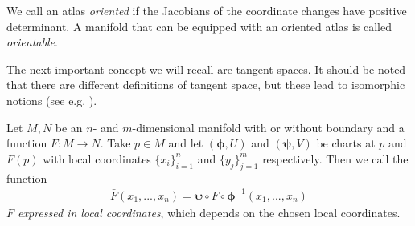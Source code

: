 \documentclass[../master_thesis.tex]{subfiles}
\begin{document}
\begin{definition}
    We call an atlas \textit{oriented} if the Jacobians of the coordinate
    changes have positive determinant. A manifold that can be equipped with 
    an oriented atlas is called \textit{orientable}.
\end{definition}


The next important concept we will recall are tangent spaces. 
It should be noted that there are different definitions of tangent space, but
these lead to isomorphic notions 
(see e.g. \cite[Sec.\,1.B]{gallot_hulin_lafontaine}).

\begin{definition}
    Let $M, N$ be an $n$- and $m$-dimensional manifold with or without boundary 
    and a function $F: M \rightarrow N$. Take $p \in M$ and let $(\boldsymbol{\phi}, U)$ 
    and $(\boldsymbol{\psi},V)$ be charts at $p$ and $F(p)$ with local 
    coordinates $\{x_i\}_{i=1}^n$ and $\{y_j\}_{j=1}^m$ respectively. 
    Then we call the function 
    \begin{align*}
        \bar{F} (x_1,...,x_n) = \boldsymbol{\psi} \circ F \circ \boldsymbol{\phi}^{-1}(x_1,...,x_n)        
    \end{align*}
    \textit{$F$ expressed in local coordinates}, which depends
    on the chosen local coordinates.
\end{definition}
\end{document}
